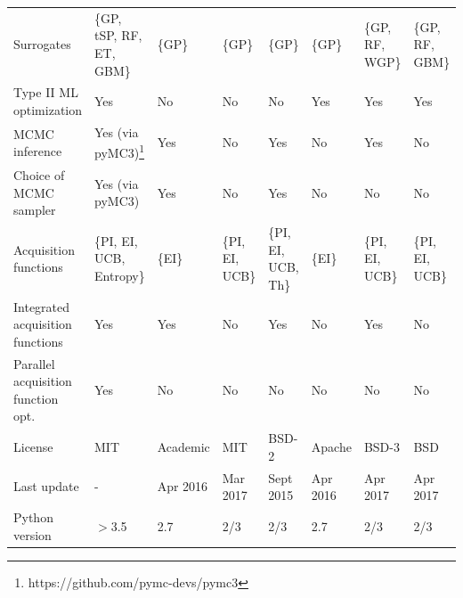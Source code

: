 \documentclass[10pt,a4paper,twoside]{book}
\begin{document}
\begin{table}
\begin{adjustbox}{width=1\textwidth}
\begin{tabular}{@{}llllllll@{}}
Surrogates                         & \{GP, tSP, RF, ET, GBM\} & \{GP\}     & \{GP\}                    & \{GP\}      & \{GP\} & \{GP, RF, WGP\} & \{GP, RF, GBM\}   \\
Type II ML optimization            & \color{green} Yes                      &     \color{red} No       & \color{red} No                       & \color{red} No         &  \color{green} Yes      & \color{green} Yes             & \color{green} Yes               \\
MCMC inference                     & {\color{green} Yes} (via pyMC3)\footnote{https://github.com/pymc-devs/pymc3}          & \color{green} Yes        & \color{red} No                       & \color{green} Yes         & \color{red} No      & \color{green} Yes             &  \color{red} No                  \\
Choice of MCMC sampler             & {\color{green} Yes} (via pyMC3)          &  \color{green} Yes          & \color{red} No                       &  \color{green} Yes           &  \color{red} No      & \color{red} No             & \color{red} No               \\
Acquisition functions              & \{PI, EI, UCB, Entropy\} &  \{EI\}          & \{PI, EI, UCB\}           &  \{PI, EI, UCB, Th\}          &  \{EI\}      &       \{PI, EI, UCB\}          & \{PI, EI, UCB\}                   \\
Integrated acquisition functions   & \color{green} Yes                      &  \color{green} Yes       & \color{red} No                       &  \color{green} Yes           &  \color{red} No      & \color{green} Yes             & \color{red} No               \\
Parallel acquisition function opt. & \color{green} Yes                      & \color{red} No        & \color{red} No                       & \color{red} No         &   \color{red} No     & \color{red} No                 & \color{red} No               \\
License                            & MIT                      &   Academic         & MIT                       & BSD-2       & Apache       & BSD-3           & BSD               \\
Last update                        &            -              & Apr 2016 & Mar 2017  & Sept 2015           &   Apr 2016     &  Apr 2017                &     Apr 2017              \\
Python version & $>$3.5 & 2.7 & 2/3 & 2/3 & 2.7 & 2/3 & 2/3 \\ \bottomrule
\end{tabular}
\end{adjustbox}
\end{table}
\end{document}
